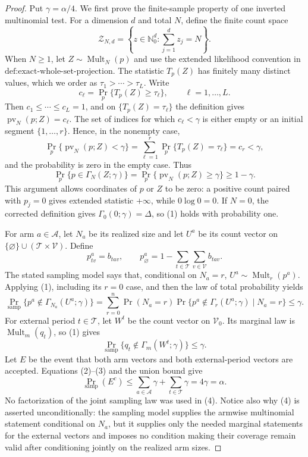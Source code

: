 \documentclass{article}
\begin{document}
\begin{proof}
Put \(\gamma=\alpha/4\). We first prove the finite-sample property of one inverted multinomial test. For a dimension \(d\) and total \(N\), define the finite count space
\[
 \mathcal Z_{N,d}=\left\{z\in\mathbb N_0^d:\sum_{j=1}^d z_j=N\right\}.
\]
When \(N\geq1\), let \(Z\sim\operatorname{Mult}_N(p)\) and use the extended likelihood convention in \(\text{def:exact-whole-set-projection}\). The statistic \(T_p(Z)\) has finitely many distinct values, which we order as \(\tau_1>\cdots>\tau_L\). Write
\[
 c_\ell=\Pr_p\{T_p(Z)\geq\tau_\ell\},\qquad \ell=1,\ldots,L.
\]
Then \(c_1\leq\cdots\leq c_L=1\), and on \(\{T_p(Z)=\tau_\ell\}\) the definition gives \(\operatorname{pv}_N(p;Z)=c_\ell\). The set of indices for which \(c_\ell<\gamma\) is either empty or an initial segment \(\{1,\ldots,r\}\). Hence, in the nonempty case,
\[
 \Pr_p\{\operatorname{pv}_N(p;Z)<\gamma\}
 =\sum_{\ell=1}^r\Pr_p\{T_p(Z)=\tau_\ell\}
 =c_r<\gamma,
\]
and the probability is zero in the empty case. Thus
\[
 \Pr_p\{p\in\Gamma_N(Z;\gamma)\}
 =\Pr_p\{\operatorname{pv}_N(p;Z)\geq\gamma\}
 \geq1-\gamma. \tag{1}
\]
This argument allows coordinates of \(p\) or \(Z\) to be zero: a positive count paired with \(p_j=0\) gives extended statistic \(+\infty\), while \(0\log0=0\). If \(N=0\), the corrected definition gives \(\Gamma_0(0;\gamma)=\Delta\), so (1) holds with probability one.

For arm \(a\in\mathcal A\), let \(N_a\) be its realized size and let \(U^a\) be its count vector on \(\{\varnothing\}\cup(\mathcal T\times\mathcal V)\). Define
\[
 p^a_{tv}=b_{tav},\qquad
 p^a_{\varnothing}=1-\sum_{t\in\mathcal T}\sum_{v\in\mathcal V}b_{tav}.
\]
The stated sampling model says that, conditional on \(N_a=r\), \(U^a\sim\operatorname{Mult}_r(p^a)\). Applying (1), including its \(r=0\) case, and then the law of total probability yields
\[
 \Pr_{\mathrm{samp}}\{p^a\notin\Gamma_{N_a}(U^a;\gamma)\}
 =\sum_{r=0}^n\Pr(N_a=r)
   \Pr\{p^a\notin\Gamma_r(U^a;\gamma)\mid N_a=r\}
 \leq\gamma. \tag{2}
\]
For external period \(t\in\mathcal T\), let \(W^t\) be the count vector on \(\mathcal V_0\). Its marginal law is \(\operatorname{Mult}_m(q_t)\), so (1) gives
\[
 \Pr_{\mathrm{samp}}\{q_t\notin\Gamma_m(W^t;\gamma)\}\leq\gamma. \tag{3}
\]
Let \(E\) be the event that both arm vectors and both external-period vectors are accepted. Equations (2)--(3) and the union bound give
\[
 \Pr_{\mathrm{samp}}(E^c)
 \leq\sum_{a\in\mathcal A}\gamma+\sum_{t\in\mathcal T}\gamma
 =4\gamma=\alpha. \tag{4}
\]
No factorization of the joint sampling law was used in (4). Notice also why (4) is asserted unconditionally: the sampling model supplies the armwise multinomial statement conditional on \(N_a\), but it supplies only the needed marginal statements for the external vectors and imposes no condition making their coverage remain valid after conditioning jointly on the realized arm sizes.


\end{proof}
\end{document}
